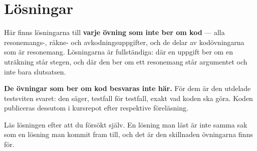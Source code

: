 \chapter{Lösningar}
\label{ch:losningar}

Här finns lösningarna till \textbf{varje övning som inte ber om kod} --- alla resonemangs-, räkne- och
avkodningsuppgifter, och de delar av kodövningarna som är resonemang. Lösningarna är fullständiga:
där en uppgift ber om en uträkning står stegen, och där den ber om ett resonemang står argumentet
och inte bara slutsatsen.

\textbf{De övningar som ber om kod besvaras inte här.} För dem är den utdelade testsviten svaret:
den säger, testfall för testfall, exakt vad koden ska göra. Koden publiceras dessutom i kursrepot
efter respektive föreläsning.

Läs lösningen efter att du försökt själv. En lösning man läst är inte samma sak som en lösning man
kommit fram till, och det är den skillnaden övningarna finns för.
























